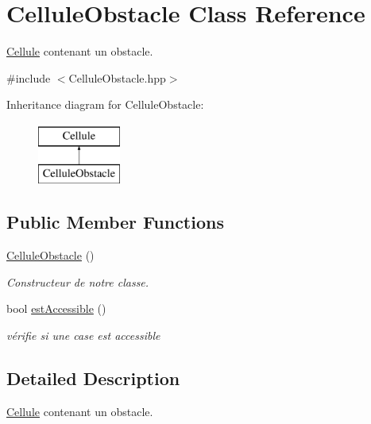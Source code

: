 \hypertarget{classCelluleObstacle}{\section{Cellule\-Obstacle Class Reference}
\label{classCelluleObstacle}
}


\hyperlink{classCellule}{Cellule} contenant un obstacle.  




{\ttfamily \#include $<$Cellule\-Obstacle.\-hpp$>$}

Inheritance diagram for Cellule\-Obstacle\-:\begin{figure}[H]
\begin{center}
\leavevmode
\includegraphics[height=2.000000cm]{classCelluleObstacle}
\end{center}
\end{figure}
\subsection*{Public Member Functions}
\begin{DoxyCompactItemize}
\item 
\hypertarget{classCelluleObstacle_a03257715748cbe82a95fe36af7ab51a5}{\hyperlink{classCelluleObstacle_a03257715748cbe82a95fe36af7ab51a5}{Cellule\-Obstacle} ()}\label{classCelluleObstacle_a03257715748cbe82a95fe36af7ab51a5}

\begin{DoxyCompactList}\small\item\em Constructeur de notre classe. \end{DoxyCompactList}\item 
bool \hyperlink{classCelluleObstacle_a8934b0a165d8b17c6710c3e42faf33f3}{est\-Accessible} ()
\begin{DoxyCompactList}\small\item\em vérifie si une case est accessible \end{DoxyCompactList}\end{DoxyCompactItemize}


\subsection{Detailed Description}
\hyperlink{classCellule}{Cellule} contenant un obstacle. 

